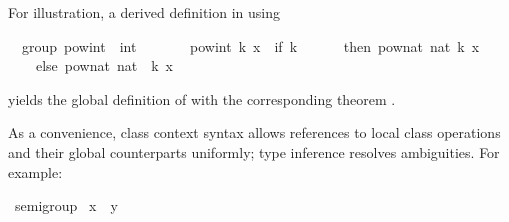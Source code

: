 \begin{isabellebody}
\begin{isamarkuptext}
  For illustration, a derived definition
  in  using %
\end{isamarkuptext}%
\isamarkuptrue%
%
\isadelimquote
%
\endisadelimquote
%
\isatagquote
{}\isamarkupfalse%
\ {\isacharparenleft}\ group{\isacharparenright}\ pow{\isacharunderscore}int\ {\isacharcolon}{\isacharcolon}\ {\isachardoublequoteopen}int\ {\isasymRightarrow}\ {\isasymalpha}\ {\isasymRightarrow}\ {\isasymalpha}{\isachardoublequoteclose}\ \isanewline
\ \ {\isachardoublequoteopen}pow{\isacharunderscore}int\ k\ x\ {\isacharequal}\ {\isacharparenleft}if\ k\ {\isachargreater}{\isacharequal}\ {}\isanewline
\ \ \ \ then\ pow{\isacharunderscore}nat\ {\isacharparenleft}nat\ k{\isacharparenright}\ x\isanewline
\ \ \ \ else\ {\isacharparenleft}pow{\isacharunderscore}nat\ {\isacharparenleft}nat\ {\isacharparenleft}{\isacharminus}\ k{\isacharparenright}{\isacharparenright}\ x{\isacharparenright}{\isasymdiv}{\isacharparenright}{\isachardoublequoteclose}%
\endisatagquote
{\isafoldquote}%
%
\isadelimquote
%
\endisadelimquote
%
\begin{isamarkuptext}%
\noindent yields the global definition of
  with the corresponding theorem .%
\end{isamarkuptext}%
\isamarkuptrue%
%
\isamarkuptrue%
%
\begin{isamarkuptext}%
As a convenience, class context syntax allows references
  to local class operations and their global counterparts
  uniformly;  type inference resolves ambiguities.  For example:%
\end{isamarkuptext}%
\isamarkuptrue%
%
\isadelimquote
%
\endisadelimquote
%
\isatagquote
{}\isamarkupfalse%
\ semigroup\isanewline
{}\isanewline
\isanewline
{}\isamarkupfalse%
\ {\isachardoublequoteopen}x\ {\isasymotimes}\ y{\isachardoublequoteclose}\ %

\end{isabellebody}
